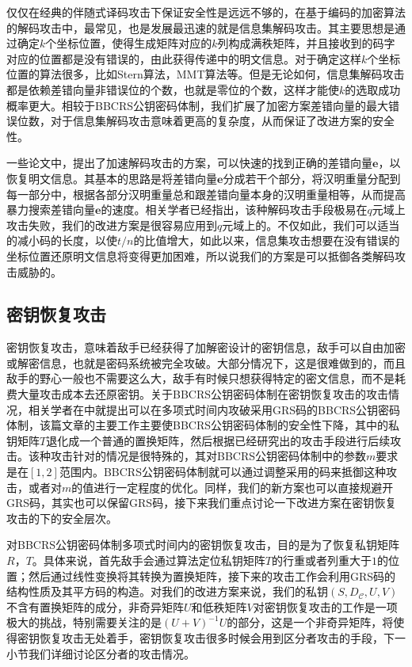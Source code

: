 仅仅在经典的伴随式译码攻击下保证安全性是远远不够的，在基于编码的加密算法的解码攻击中，最常见，也是发展最迅速的就是信息集解码攻击。其主要思想是通过确定$k$个坐标位置，使得生成矩阵对应的$k$列构成满秩矩阵，并且接收到的码字对应的位置都是没有错误的，由此获得传递中的明文信息。对于确定这样$k$个坐标位置的算法很多，比如Stern算法，MMT算法等。但是无论如何，信息集解码攻击都是依赖差错向量非错误位的个数，也就是零位的个数，这样才能使$k$的选取成功概率更大。相较于BBCRS公钥密码体制，我们扩展了加密方案差错向量的最大错误位数，对于信息集解码攻击意味着更高的复杂度，从而保证了改进方案的安全性。

一些论文中，提出了加速解码攻击的方案，可以快速的找到正确的差错向量$\mathbf{e}$，以恢复明文信息。其基本的思路是将差错向量$\mathbf{e}$分成若干个部分，将汉明重量分配到每一部分中，根据各部分汉明重量总和跟差错向量本身的汉明重量相等，从而提高暴力搜索差错向量$\mathbf{e}$的速度。相关学者已经指出，该种解码攻击手段极易在$q$元域上攻击失败，我们的改进方案是很容易应用到$q$元域上的。不仅如此，我们可以适当的减小码的长度，以使$t/n$的比值增大，如此以来，信息集攻击想要在没有错误的坐标位置还原明文信息将变得更加困难，所以说我们的方案是可以抵御各类解码攻击威胁的。

\subsection{密钥恢复攻击}
密钥恢复攻击，意味着敌手已经获得了加解密设计的密钥信息，敌手可以自由加密或解密信息，也就是密码系统被完全攻破。大部分情况下，这是很难做到的，而且敌手的野心一般也不需要这么大，敌手有时候只想获得特定的密文信息，而不是耗费大量攻击成本去还原密钥。关于BBCRS公钥密码体制在密钥恢复攻击的攻击情况，相关学者在\cite{Couvreur2015A}中就提出可以在多项式时间内攻破采用GRS码的BBCRS公钥密码体制，该篇文章的主要工作主要使BBCRS公钥密码体制的安全性下降，其中的私钥矩阵$T$退化成一个普通的置换矩阵，然后根据已经研究出的攻击手段进行后续攻击。该种攻击针对的情况是很特殊的，其对BBCRS公钥密码体制中的参数$m$要求是在$[1, 2]$范围内。BBCRS公钥密码体制就可以通过调整采用的码来抵御这种攻击，或者对$m$的值进行一定程度的优化。同样，我们的新方案也可以直接规避开GRS码，其实也可以保留GRS码，接下来我们重点讨论一下改进方案在密钥恢复攻击的下的安全层次。

对BBCRS公钥密码体制多项式时间内的密钥恢复攻击，目的是为了恢复私钥矩阵$R$，$T$。具体来说，首先敌手会通过算法定位私钥矩阵$T$的行重或者列重大于$1$的位置；然后通过线性变换将其转换为置换矩阵，接下来的攻击工作会利用GRS码的结构性质及其平方码的构造。对我们的改进方案来说，我们的私钥$(S,D_\mathcal{C},U,V)$不含有置换矩阵的成分，非奇异矩阵$U$和低秩矩阵$V$对密钥恢复攻击的工作是一项极大的挑战，特别需要关注的是$(U+V)^{-1}U$的部分，这是一个非奇异矩阵，将使得密钥恢复攻击无处着手，密钥恢复攻击很多时候会用到区分者攻击的手段，下一小节我们详细讨论区分者的攻击情况。

